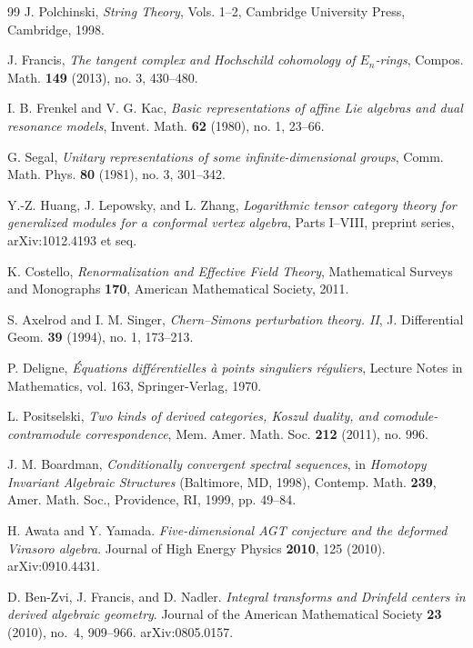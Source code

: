 \begin{thebibliography}{99}
 J. Polchinski, \emph{String Theory}, Vols. 1--2, Cambridge University Press, Cambridge, 1998.


 J. Francis, \emph{The tangent complex and Hochschild cohomology of $E_n$-rings}, Compos. Math. \textbf{149} (2013), no. 3, 430--480.

 I. B. Frenkel and V. G. Kac, \emph{Basic representations of affine Lie algebras and dual resonance models}, Invent. Math. \textbf{62} (1980), no. 1, 23--66.

 G. Segal, \emph{Unitary representations of some infinite-dimensional groups}, Comm. Math. Phys. \textbf{80} (1981), no. 3, 301--342.

 Y.-Z. Huang, J. Lepowsky, and L. Zhang, \emph{Logarithmic tensor category theory for generalized modules for a conformal vertex algebra}, Parts I--VIII, preprint series, arXiv:1012.4193 et seq.

 K. Costello, \emph{Renormalization and Effective Field Theory}, Mathematical Surveys and Monographs \textbf{170}, American Mathematical Society, 2011.

 S. Axelrod and I. M. Singer, \emph{Chern--Simons perturbation theory. II}, J. Differential Geom. \textbf{39} (1994), no. 1, 173--213.

 P. Deligne, \emph{\'Equations diff\'erentielles \`a points singuliers r\'eguliers}, Lecture Notes in Mathematics, vol. 163, Springer-Verlag, 1970.

 L. Positselski, \emph{Two kinds of derived categories, Koszul duality, and comodule-contramodule correspondence}, Mem. Amer. Math. Soc. \textbf{212} (2011), no. 996.

 J. M. Boardman, \emph{Conditionally convergent spectral sequences}, in \emph{Homotopy Invariant Algebraic Structures} (Baltimore, MD, 1998), Contemp. Math. \textbf{239}, Amer. Math. Soc., Providence, RI, 1999, pp. 49--84.



H. Awata and Y. Yamada.
\textit{Five-dimensional AGT conjecture and the deformed Virasoro algebra}.
Journal of High Energy Physics \textbf{2010}, 125 (2010).
arXiv:0910.4431.

D. Ben-Zvi, J. Francis, and D. Nadler.
\textit{Integral transforms and Drinfeld centers in derived algebraic geometry}.
Journal of the American Mathematical Society \textbf{23} (2010), no.~4, 909--966.
arXiv:0805.0157.


\end{thebibliography}
